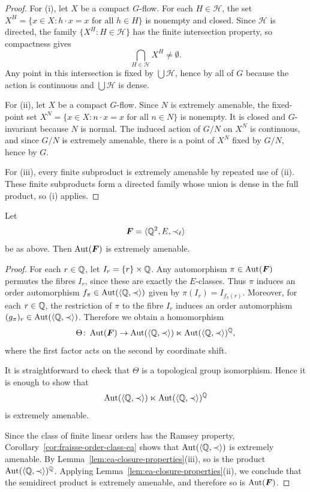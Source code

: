 \begin{proof}

    For (i), let \(X\) be a compact \(G\)-flow. For each \(H\in\mathcal{H}\), the set \(X^H=\{x\in X : h\cdot x=x \text{ for all } h\in H\}\)
    is nonempty and closed. Since \(\mathcal{H}\) is directed, the family \(\{X^H : H\in\mathcal{H}\}\) has the finite intersection property, so compactness gives
    \[
        \bigcap_{H\in\mathcal{H}} X^H\neq\emptyset.
    \]
    Any point in this intersection is fixed by \(\bigcup\mathcal{H}\), hence by all of \(G\) because the action is continuous and \(\bigcup\mathcal{H}\) is dense.

    For (ii), let \(X\) be a compact \(G\)-flow. Since \(N\) is extremely amenable, the fixed-point set \(X^N=\{x\in X : n\cdot x=x \text{ for all } n\in N\}\)
    is nonempty. It is closed and \(G\)-invariant because \(N\) is normal. The induced action of \(G/N\) on \(X^N\) is continuous, and since \(G/N\) is extremely amenable, there is a point of \(X^N\) fixed by \(G/N\), hence by \(G\).

    For (iii), every finite subproduct is extremely amenable by repeated use of (ii). These finite subproducts form a directed family whose union is dense in the full product, so (i) applies.
\end{proof}

\begin{theorem}
    \label{thm:convex-eq-ea}
    Let
    \[
        \boldsymbol{F}=\langle \mathbb{Q}^2,E,\prec_{\ell}\rangle
    \]
    be as above. Then \(\operatorname{Aut}(\boldsymbol{F})\) is extremely amenable.
\end{theorem}

\begin{proof}


    For each \(r\in \mathbb{Q}\), let \(I_r=\{r\}\times \mathbb{Q}\).
    Any automorphism \(\pi\in \operatorname{Aut}(\boldsymbol{F})\) permutes the fibres \(I_r\), since these are exactly the \(E\)-classes. Thus \(\pi\) induces an order automorphism \(f_{\pi}\in \operatorname{Aut}(\langle \mathbb{Q},\prec\rangle)\) given by \(\pi(I_r)=I_{f_{\pi}(r)}\).
    Moreover, for each \(r\in \mathbb{Q}\), the restriction of \(\pi\) to the fibre \(I_r\) induces an order automorphism \((g_{\pi})_r\in \operatorname{Aut}(\langle \mathbb{Q},\prec\rangle)\).
    Therefore we obtain a homomorphism
    \[
        \Theta\colon \operatorname{Aut}(\boldsymbol{F})\to \operatorname{Aut}(\langle \mathbb{Q},\prec\rangle)\ltimes \operatorname{Aut}(\langle \mathbb{Q},\prec\rangle)^{\mathbb{Q}},
    \]
    where the first factor acts on the second by coordinate shift.

    It is straightforward to check that \(\Theta\) is a topological group isomorphism. Hence it is enough to show that
    \[
        \operatorname{Aut}(\langle \mathbb{Q},\prec\rangle)\ltimes \operatorname{Aut}(\langle \mathbb{Q},\prec\rangle)^{\mathbb{Q}}
    \]
    is extremely amenable.

    Since the class of finite linear orders has the Ramsey property,
    Corollary~\ref{cor:fraisse-order-class-ea} shows that
    \(\operatorname{Aut}(\langle \mathbb{Q},\prec\rangle)\) is extremely amenable. By
    Lemma~\ref{lem:ea-closure-properties}(iii), so is the product
    \(\operatorname{Aut}(\langle \mathbb{Q},\prec\rangle)^{\mathbb{Q}}\).
    Applying Lemma~\ref{lem:ea-closure-properties}(ii), we conclude that the semidirect product is extremely amenable, and therefore so is \(\operatorname{Aut}(\boldsymbol{F})\).
\end{proof}

